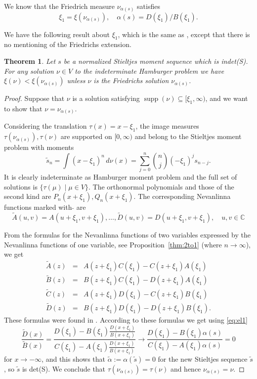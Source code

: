 \documentclass[12pt]{article}
\newtheorem{thm}{Theorem}[section]
\DeclareMathOperator{\supp}{supp}
\newcommand{\C}{\mathbb{C}}
\def\C{\mathbb{C}}
\begin{document}
We know that the Friedrich measure $\nu_{\alpha(s)}$ satisfies
\begin{equation}\label{eq:el1}
\xi_1=\xi(\nu_{\alpha(s)}),\quad \alpha(s)=D(\xi_1)/B(\xi_1).
\end{equation}

We have the following result about $\xi_1$, which is the same as \cite[Lemma 2]{Ch1}, except that there is no mentioning of the Friedrichs extension.

\begin{thm}\label{thm:Fr2} Let $s$ be a normalized Stieltjes moment sequence which is indet(S). For any solution $\nu\in V$ to the indeterminate Hamburger problem we have
$\xi(\nu)<\xi(\nu_{\alpha(s)})$ unless $\nu$ is the Friedrichs solution $\nu_{\alpha(s)}$.
\end{thm}

\begin{proof} Suppose that $\nu$ is a solution satisfying $\supp(\nu)\subseteq [\xi_1,\infty)$, and we want to show that $\nu=\nu_{\alpha(s)}$.

Considering the translation $\tau(x)=x-\xi_1$,  the image measures $\tau(\nu_{\alpha(s)}), \tau(\nu)$ are supported on $[0,\infty)$ and belong to the Stieltjes moment problem  with moments
$$
\tilde{s}_n=\int (x-\xi_1)^n\,d\nu(x)=\sum_{j=0}^n\binom{n}{j} (-\xi_1)^js_{n-j}.
$$
It is clearly indeterminate as Hamburger moment problem and the full set of solutions is
$\{\tau(\mu)\mid \mu\in V\}$. The orthonormal polynomials and those of the second kind are $P_n(x+\xi_1),Q_n(x+\xi_1)$. The corresponding Nevanlinna functions marked with  $\tilde{}$ are
$$
\tilde{A}(u,v)=A(u+\xi_1,v+\xi_1),\ldots,\tilde{D}(u,v)=D(u+\xi_1,v+\xi_1),\quad u,v\in\C
$$

From the formulas for the Nevanlinna functions of two variables expressed by the Nevanlinna functions of one variable, see Proposition~\ref{thm:2to1} (where $n\to\infty$), we get
\begin{eqnarray*}
\tilde{A}(z)&=&A(z+\xi_1)C(\xi_1)-C(z+\xi_1)A(\xi_1)\\
\tilde{B}(z)&=&B(z+\xi_1)C(\xi_1)-D(z+\xi_1)A(\xi_1)\\
\tilde{C}(z)&=&A(z+\xi_1)D(\xi_1)-C(z+\xi_1)B(\xi_1)\\
\tilde{D}(z)&=&B(z+\xi_1)D(\xi_1)-D(z+\xi_1)B(\xi_1).
\end{eqnarray*}
These formulas were found in \cite[Proposition 3.3]{Pe1}.
According to these formulas we get using \eqref{eq:el1}
$$
\frac{\tilde{D}(x)}{\tilde{B}(x)}=\frac{D(\xi_1)-B(\xi_1)\frac{D(x+\xi_1)}{B(x+\xi_1)}}
{C(\xi_1)-A(\xi_1)\frac{D(x+\xi_1)}{B(x+\xi_1)}}\to \frac{D(\xi_1)-B(\xi_1)\alpha(s)}
{C(\xi_1)-A(\xi_1)\alpha(s)}=0
$$
for $x\to -\infty$,  and this shows that $\tilde{\alpha}:=\alpha(\tilde{s})=0$ for the new Stieltjes sequence $\tilde{s}$, so $\tilde{s}$ is det(S). We conclude that $\tau(\nu_{\alpha(s)})=\tau(\nu)$
and hence $\nu_{\alpha(s)}=\nu$.
\end{proof}
\end{document}
